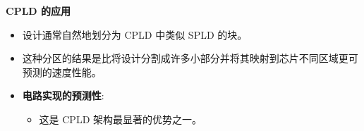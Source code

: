 \begin{frame}[allowframebreaks]{\textbf{CPLD 的应用}}
\begin{itemize}
    \begin{itemize}
    \tightlist
    \item
    设计通常自然地划分为 CPLD 中类似 SPLD 的块。
    \item
    这种分区的结果是比将设计分割成许多小部分并将其映射到芯片不同区域更可预测的速度性能。
    \item
    \textbf{电路实现的预测性}:

    \begin{itemize}
    \tightlist
    \item
        这是 CPLD 架构最显著的优势之一。
    \end{itemize}
    \end{itemize}
\end{itemize}
\end{frame}
